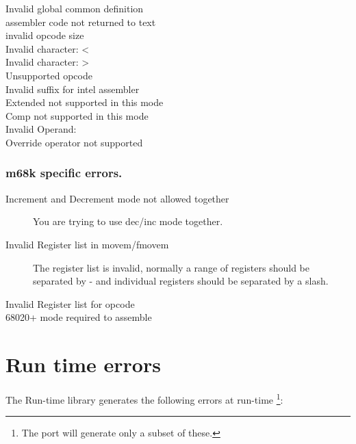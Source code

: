 \documentclass{book}
\begin{document}
\begin{description}
\item [ Invalid global common definition ]
\item [ assembler code not returned to text ]
\item [ invalid opcode size ]
\item [ Invalid character: < ]
\item [ Invalid character: > ]
\item [ Unsupported opcode ]
\item [ Invalid suffix for intel assembler ]
\item [ Extended not supported in this mode ]
\item [ Comp not supported in this mode ]
\item [ Invalid Operand: ]
\item [ Override operator not supported ]
\end{description}

\subsection{m68k specific errors.}
\begin{description}
\item [Increment and Decrement mode not allowed together]
You are trying to use dec/inc mode together.

\item [Invalid Register list in movem/fmovem]
The register list is invalid, normally a range of registers should
be separated by - and individual registers should be separated by
a slash.
\item [Invalid Register list for opcode]
\item [68020+ mode required to assemble]
\end{description}

\chapter{Run time errors}
The \fpc Run-time library generates the following errors at run-time
\footnote{The \linux port will generate only a subset of these.}:
\end{document}
